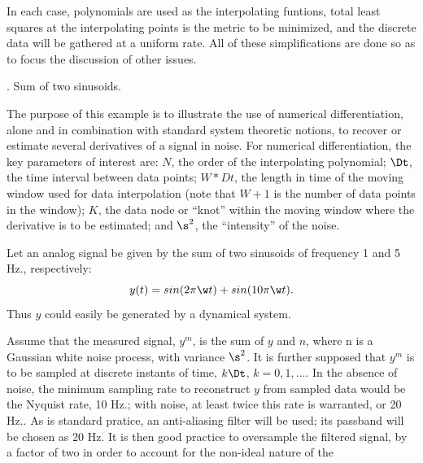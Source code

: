In each case, polynomials are used as the interpolating
funtions, total least squares at the interpolating points is the 
metric to be minimized, and the discrete data will be gathered at a uniform rate.
All of  these simplifications are done so as to focus the discussion of other issues.

\medskip\noindent
{. Sum of two sinusoids.}

The purpose of this example is to illustrate the use of numerical
differentiation, alone and 
in combination with standard system theoretic notions,
to recover or estimate several derivatives of a signal in noise.  For numerical
differentiation, the key
parameters of interest are: $N$, the order of the interpolating polynomial;
$\Dt$, the time interval between data points;
$W * Dt$, the length in time of the moving window used for data interpolation
(note that $W + 1$ is the number of data points in the window);
$K$, the data node or ``knot'' within the moving window 
where the derivative is to be estimated; and $\s^2$, the ``intensity'' of the noise.


Let an analog signal be given by the sum of two sinusoids of frequency 1 and
5 Hz., respectively:
\begin{equation}
y(t) = sin(2 \pi \w t) + sin(10 \pi \w t).
\label{sines}
\end{equation}
Thus $y$ could easily be generated by a dynamical system. 


Assume that the measured signal, $y^m$, is the sum of $y$ and $n$, where n is a
Gaussian white noise process, with variance $\s^2$.  It is further supposed that
$y^m$ is to be sampled at discrete instants of time,
$k \Dt$, $k = 0, 1, ...$.  In the absence of noise, the minimum sampling rate 
to reconstruct $y$ from sampled data would be the Nyquist rate, 10 Hz.; with
noise,
at least twice this rate is warranted, or 20 Hz..  As is standard pratice, an 
anti-aliasing filter will be used; its passband will be chosen as 20 Hz.  
It is then good practice to oversample the filtered signal, by a factor
of two in order to account for the non-ideal nature of the


